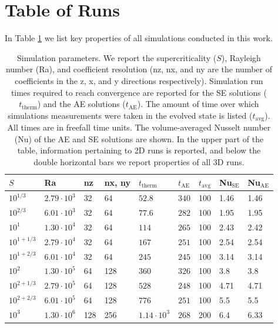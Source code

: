 \documentclass[aps, pre, onecolumn, nofootinbib, notitlepage, groupedaddress, amsfonts, amssymb, amsmath, longbibliography]{revtex4-1}
\begin{document}
\section{Table of Runs}
\label{appendix:run_table}
In Table \ref{table:run_parameters} we list key properties of all simulations
conducted in this work.  
\begin{table}
\caption{Simulation parameters. We report the supercriticality ($S$), Rayleigh number (Ra), 
and coefficient resolution (nz, nx, and ny are the number of coefficients in the
z, x, and y directions respectively).
Simulation run times required to reach convergence
are reported for the SE solutions ($t_{\text{therm}}$) and the AE solutions ($t_{\text{AE}}$).
The amount of time over which simulations measurements were taken in the evolved
state is listed ($t_{\text{avg}}$). All times are in freefall time units.  
The volume-averaged Nusselt number (Nu) of the
AE and SE solutions are shown.
In the upper part of the table, information pertaining to 2D runs is reported,
and below the double horizontal bars we report properties of all
3D runs.
}
\label{table:run_parameters}
\begin{center}
\begin{tabularx}{\textwidth}{ X X X X | X X X | X X }
\hline																	
$S$	&	Ra	&	nz	&	nx, ny	&	$t_{\text{therm}}$	&	$t_{\text{AE}}$	&	$t_{\text{avg}}$	&	Nu$_{\text{SE}}$	&	Nu$_{\text{AE}}$	\\
\hline																	
$10^{1/3}$	&	$2.79 \cdot 10^3$	&	32	&	64	&	$52.8$	&	$340$	&	100	&	1.46	&	1.46	\\
$10^{2/3}$	&	$6.01 \cdot 10^3$	&	32	&	64	&	$77.6$	&	$282$	&	100	&	1.95	&	1.95	\\
$10^1$	&	$1.30 \cdot 10^4$	&	32	&	64	&	$114$	&	$265$	&	100	&	2.43	&	2.42	\\
$10^{1 + 1/3}$	&	$2.79 \cdot 10^4$	&	32	&	64	&	$167$	&	$251$	&	100	&	2.54	&	2.54	\\
$10^{1 + 2/3}$	&	$6.01 \cdot 10^4$	&	32	&	64	&	$245$	&	$245$	&	100	&	3.14	&	3.14	\\
$10^2$	&	$1.30 \cdot 10^5$	&	64	&	128	&	$360$	&	$326$	&	100	&	3.8	&	3.8	\\
$10^{2 + 1/3}$	&	$2.79 \cdot 10^5$	&	64	&	128	&	$528$	&	$248$	&	100	&	4.71	&	4.71	\\
$10^{2 + 2/3}$	&	$6.01 \cdot 10^5$	&	64	&	128	&	$776$	&	$251$	&	100	&	5.5	&	5.5	\\
$10^3$	&	$1.30 \cdot 10^6$	&	128	&	256	&	$1.14 \cdot 10^3$	&	$268$	&	200	&	6.4	&	6.33	\\

\end{tabularx}
\end{center}
\end{table}
\end{document}
